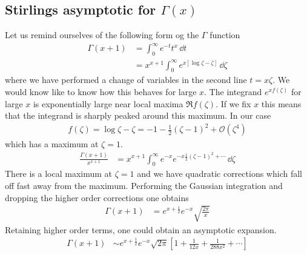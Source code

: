 \documentclass[a4paper,12pt]{article}
\begin{document}
\subsection{Stirlings asymptotic for $\Gamma(x)$}
Let us remind ourselves of the following form og the $\Gamma$ function
\begin{equation}
	\begin{aligned}
		\Gamma(x+1)&=\int_{0}^{\infty}e^{-t} t^x \,\dd t\\
		&=x^{x+1}\int_{0}^{\infty}e^{x\left[\log \zeta-\zeta\right]} \,\dd \zeta
	\end{aligned}
\end{equation}
where we have performed a change of variables in the second line $t=x\zeta$. We would know like to know how this behaves for large $x$. The integrand $e^{xf(\zeta)}$ for large $x$ is exponentially large near local maxima $\Re f(\zeta)$. If we fix $x$ this means that the integrand is sharply peaked around this maximum.  In our case 
\begin{equation}
	\begin{aligned}
		f(\zeta)=\log \zeta -\zeta =-1-\frac{1}{2}(\zeta-1)^2+\mathcal{O}(\zeta^4)
	\end{aligned}
\end{equation}
which has a maximum at $\zeta=1$.
\begin{equation}
	\begin{aligned}
				\frac{\Gamma(x+1)}{x^{x+1}}
		&=x^{x+1}\int_{0}^{\infty}e^{-x}e^{-x\frac{1}{2}(\zeta-1)^2+\cdots} \,\dd \zeta
	\end{aligned}
\end{equation}
There is a local maximum at $\zeta=1$ and we have quadratic corrections which fall off fast away from the maximum. Performing the Gaussian integration and dropping the higher order corrections one obtains
\begin{equation}
	\begin{aligned}
		\Gamma(x+1)
		&=e^{x+\frac{1}{2}}e^{-x}\sqrt{\frac{2\pi}{x}}
	\end{aligned}
\end{equation}
Retaining higher order terms, one could obtain an asymptotic expansion.
\begin{equation}
	\begin{aligned}
		\Gamma(x+1)
		&\sim e^{x+\frac{1}{2}}e^{-x}\sqrt{2\pi}\left[1+\frac{1}{12x}+\frac{1}{288x^2}+\cdots \right]
	\end{aligned}
\end{equation}
\end{document}
